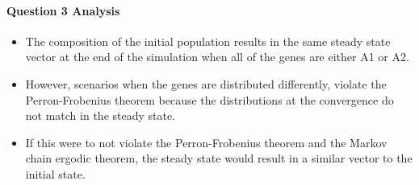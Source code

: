 \documentclass[11pt]{article}
\makeatletter
\providecommand{\tightlist}{%
      \setlength{\itemsep}{0pt}\setlength{\parskip}{0pt}}
\newcommand{\boxspacing}{\kern\kvtcb@left@rule\kern\kvtcb@boxsep}
\newcommand{\prompt}[4]{
        \ttfamily\llap{{\color{#2}[#3]:\hspace{3pt}#4}}\vspace{-\baselineskip}
    }
\makeatother
\begin{document}
    \hypertarget{question-3-analysis}{%
\paragraph{Question 3 Analysis}\label{question-3-analysis}}

    \begin{itemize}
\tightlist
\item
  The composition of the initial population results in the same steady
  state vector at the end of the simulation when all of the genes are
  either A1 or A2.
\item
  However, scenarios when the genes are distributed differently, violate
  the Perron-Frobenius theorem because the distributions at the
  convergence do not match in the steady state.
\item
  If this were to not violate the Perron-Frobenius theorem and the
  Markov chain ergodic theorem, the steady state would result in a
  similar vector to the initial state.
\end{itemize}

    \begin{tcolorbox}[breakable, size=fbox, boxrule=1pt, pad at break*=1mm,colback=cellbackground, colframe=cellborder]
\prompt{In}{incolor}{ }{\boxspacing}
\begin{Verbatim}[commandchars=\\\{\}]

\end{Verbatim}
\end{tcolorbox}


    
    
    
\end{document}
